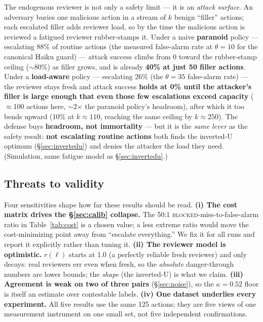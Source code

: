 \documentclass[11pt]{article}
\begin{document}
The endogenous reviewer is not only a safety limit --- it is an \emph{attack surface}. An adversary
buries one malicious action in a stream of $k$ benign ``filler'' actions; each escalated filler adds
reviewer load, so by the time the malicious action is reviewed a fatigued reviewer rubber-stamps it.
Under a naive \textbf{paranoid} policy --- escalating 88\% of routine actions (the measured false-alarm
rate at $\theta = 10$ for the canonical Haiku guard) --- attack success climbs from 0 toward the rubber-stamp ceiling ($\sim$80\%)
as filler grows, and is already \textbf{40\% at just 50 filler actions}. Under a \textbf{load-aware}
policy --- escalating 26\% (the $\theta = 35$ false-alarm rate) --- the reviewer stays fresh and attack
success \textbf{holds at 0\% until the attacker's filler is large enough that even those few
escalations exceed capacity} ($\approx$100 actions here, $\sim$2$\times$ the paranoid policy's
headroom), after which it too bends upward (10\% at $k \approx 110$, reaching the same ceiling by
$k \approx 250$). The defense buys \textbf{headroom, not immortality} --- but it is the \emph{same
lever} as the safety result: \textbf{not escalating routine actions} both finds the inverted-U optimum
(\S\ref{sec:invertedu}) and denies the attacker the load they need. (Simulation, same fatigue model as
\S\ref{sec:invertedu}.)

\subsection{Threats to validity}\label{sec:threats}

Four sensitivities shape how far these results should be read. \textbf{(i) The cost matrix drives the
\S\ref{sec:calib} collapse.} The 50:1 \textsc{blocked}-miss-to-false-alarm ratio in Table~\ref{tab:cost}
is a chosen value; a less extreme ratio would move the cost-minimizing point away from ``escalate
everything.'' We fix it for all runs and report it explicitly rather than tuning it. \textbf{(ii) The
reviewer model is optimistic.} $r(\ell)$ starts at 1.0 (a perfectly reliable fresh reviewer) and only
decays: real reviewers err even when fresh, so the \emph{absolute} danger-through numbers are lower
bounds; the \emph{shape} (the inverted-U) is what we claim. \textbf{(iii) Agreement is weak on two of
three pairs} (\S\ref{sec:noise}), so the $\kappa = 0.52$ floor is itself an estimate over contestable
labels. \textbf{(iv) One dataset underlies every experiment.} All five results use the same 125
actions; they are five views of one measurement instrument on one small set, not five independent
confirmations.
\end{document}
